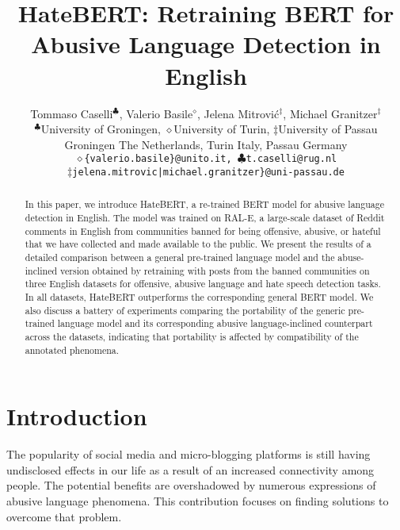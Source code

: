 \documentclass[11pt]{article}
\title{HateBERT: Retraining BERT for Abusive Language Detection in English}
\author{Tommaso Caselli$^{\clubsuit}$, Valerio Basile$^{\diamond}$, Jelena Mitrovi\'{c}$^{\ddagger}$, Michael Granitzer$^{\ddagger}$ \\
$^{\clubsuit}$University of Groningen, $\diamond$University of Turin, $\ddagger$University of Passau \\
         Groningen The Netherlands, Turin Italy, Passau Germany  \\
\tt $\diamond$\{valerio.basile\}@unito.it, 
 $\clubsuit$t.caselli@rug.nl \\ \tt $\ddagger${jelena.mitrovic|michael.granitzer\}@uni-passau.de}\\
}
\date{}
\begin{document}
\maketitle
\begin{abstract}
  In this paper, we introduce HateBERT, a re-trained BERT model for abusive language detection in English. The model was trained on RAL-E, a large-scale dataset of Reddit comments in English from communities banned for being offensive, abusive, or hateful that we have collected and made available to the public. We present the results of a detailed comparison between a general pre-trained language model and the abuse-inclined version obtained by retraining with posts from the banned communities on three English datasets for offensive, abusive language and hate speech detection tasks. In all datasets, HateBERT outperforms the corresponding general BERT model. We also discuss a battery of experiments comparing the portability of the generic pre-trained language model and its corresponding abusive language-inclined counterpart across the datasets, indicating that portability is affected by compatibility of the annotated phenomena.
\end{abstract}


\section{Introduction}

The popularity of social media and micro-blogging platforms is still having undisclosed effects in our life as a result of an increased connectivity among people. The potential benefits are overshadowed by numerous expressions of abusive language phenomena. This contribution focuses on finding solutions to overcome that problem.
\end{document}
